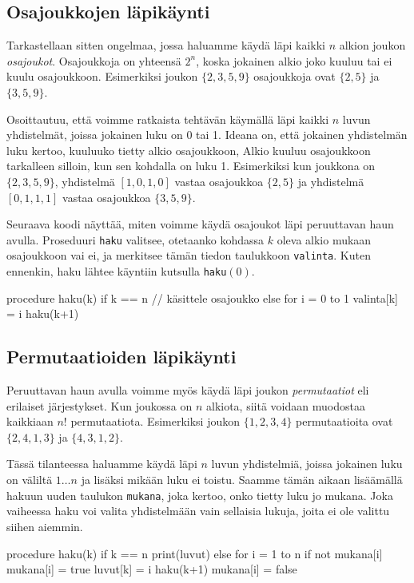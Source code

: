 \subsection{Osajoukkojen läpikäynti}

Tarkastellaan sitten ongelmaa,
jossa haluamme käydä läpi kaikki $n$ alkion
joukon \emph{osajoukot}.
Osajoukkoja on yhteensä $2^n$,
koska jokainen alkio joko kuuluu tai ei kuulu osajoukkoon.
Esimerkiksi joukon $\{2,3,5,9\}$ osajoukkoja ovat
$\{2,5\}$ ja $\{3,5,9\}$.

Osoittautuu, että voimme ratkaista tehtävän
käymällä läpi kaikki $n$ luvun yhdistelmät,
joissa jokainen luku on 0 tai 1.
Ideana on, että jokainen yhdistelmän luku kertoo,
kuuluuko tietty alkio osajoukkoon,
Alkio kuuluu osajoukkoon tarkalleen silloin,
kun sen kohdalla on luku 1.
Esimerkiksi kun joukkona on $\{2,3,5,9\}$,
yhdistelmä $[1,0,1,0]$ vastaa
osajoukkoa $\{2,5\}$ ja
yhdistelmä $[0,1,1,1]$ vastaa osajoukkoa $\{3,5,9\}$.

Seuraava koodi näyttää, miten voimme käydä osajoukot
läpi peruuttavan haun avulla.
Proseduuri \texttt{haku} valitsee,
otetaanko kohdassa $k$ oleva alkio mukaan osajoukkoon vai ei,
ja merkitsee tämän tiedon taulukkoon \texttt{valinta}.
Kuten ennenkin, haku lähtee käyntiin kutsulla \texttt{haku}$(0)$.

\begin{code}
procedure haku(k)
    if k == n
        // käsittele osajoukko
    else
        for i = 0 to 1
            valinta[k] = i
            haku(k+1)
\end{code}

\subsection{Permutaatioiden läpikäynti}

Peruuttavan haun avulla voimme myös käydä läpi joukon
\emph{permutaatiot} eli erilaiset järjestykset.
Kun joukossa on $n$ alkiota, siitä voidaan muodostaa
kaikkiaan $n!$ permutaatiota.
Esimerkiksi joukon $\{1,2,3,4\}$ permutaatioita ovat
$\{2,4,1,3\}$ ja $\{4,3,1,2\}$.

Tässä tilanteessa haluamme käydä läpi $n$ luvun yhdistelmiä,
joissa jokainen luku on väliltä $1 \dots n$
ja lisäksi mikään luku ei toistu.
Saamme tämän aikaan lisäämällä hakuun uuden taulukon
\texttt{mukana}, joka kertoo, onko tietty luku jo mukana.
Joka vaiheessa haku voi valita yhdistelmään vain sellaisia lukuja,
joita ei ole valittu siihen aiemmin.

\begin{code}
procedure haku(k)
    if k == n
        print(luvut)
    else
        for i = 1 to n
            if not mukana[i]
                mukana[i] = true
                luvut[k] = i
                haku(k+1)
                mukana[i] = false
\end{code}


